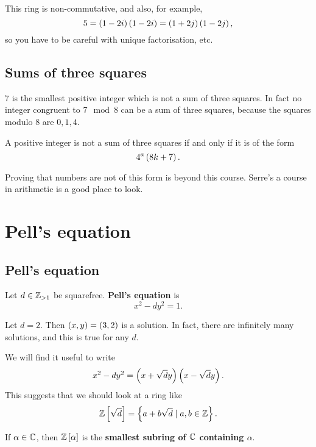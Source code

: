\begin{note*}
This ring is non-commutative, and also, for example,
$$ 5 = \br{1 - 2i}\br{1 - 2i} = \br{1 + 2j}\br{1 - 2j}, $$
so you have to be careful with unique factorisation, etc.
\end{note*}

\subsection{Sums of three squares}

$ 7 $ is the smallest positive integer which is not a sum of three squares. In fact no integer congruent to $ 7 \mod 8 $ can be a sum of three squares, because the squares modulo $ 8 $ are $ 0, 1, 4 $.

\begin{theorem}
A positive integer is not a sum of three squares if and only if it is of the form
$$ 4^a\br{8k + 7}. $$
\end{theorem}

Proving that numbers are not of this form is beyond this course. Serre's a course in arithmetic is a good place to look.

\pagebreak

\section{Pell's equation}

\subsection{Pell's equation}

Let $ d \in \mathbb{Z}_{> 1} $ be squarefree. \textbf{Pell's equation} is
$$ x^2 - dy^2 = 1. $$

\begin{example*}
Let $ d = 2 $. Then $ \br{x, y} = \br{3, 2} $ is a solution. In fact, there are infinitely many solutions, and this is true for any $ d $.
\end{example*}

We will find it useful to write
$$ x^2 - dy^2 = \br{x + \sqrt{d}y}\br{x - \sqrt{d}y}. $$
This suggests that we should look at a ring like
$$ \Z\sbr{\sqrt{d}} = \cbr{a + b\sqrt{d} \mid a, b \in \Z}. $$

\begin{definition}
If $ \alpha \in \mathbb{C} $, then $ \Z\sbr{\alpha} $ is the \textbf{smallest subring of $ \mathbb{C} $ containing $ \alpha $}.
\end{definition}

